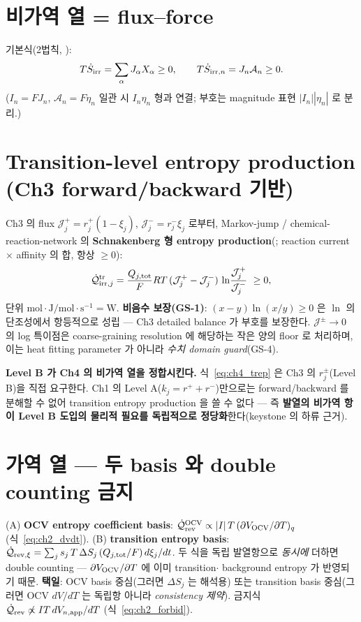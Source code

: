 \section{비가역 열 = flux--force}\label{sec:ch4_irr}
기본식(2법칙, ):
\begin{equation}
T\dot S_{\mathrm{irr}}=\sum_\alpha J_\alpha X_\alpha\ge0,\qquad
T\dot S_{\mathrm{irr},n}=J_n\mathcal A_n\ge0 .
\label{eq:ch4_JA}
\end{equation}
($I_n=FJ_n$, $\mathcal A_n=F\eta_n$ 일관 시 $I_n\eta_n$ 형과 연결; 부호는 magnitude 표현
$|I_n||\eta_n|$ 로 분리.)

\section{Transition-level entropy production (Ch3 forward/backward 기반)}\label{sec:ch4_trep}
Ch3 의 flux $\mathcal J_j^+=r_j^+(1-\xi_j)$, $\mathcal J_j^-=r_j^-\xi_j$ 로부터, Markov-jump / chemical-
reaction-network 의 \textbf{Schnakenberg 형 entropy production}(\cite{schnakenberg1976}; reaction current
$\times$ affinity 의 합, 항상 $\ge0$):
\begin{equation}
\dot{\mathcal Q}_{\mathrm{irr},j}^{\mathrm{tr}}=\frac{Q_{j,\mathrm{tot}}}{F}RT\,(\mathcal J_j^+-\mathcal J_j^-)\,
\ln\!\frac{\mathcal J_j^+}{\mathcal J_j^-}\ \ge 0,
\label{eq:ch4_trep}
\end{equation}
단위 $\mathrm{mol}\cdot\mathrm{J/mol}\cdot\mathrm{s^{-1}}=\mathrm W$. \textbf{비음수 보장(GS-1)}:
$(x-y)\ln(x/y)\ge0$ 은 $\ln$ 의 단조성에서 항등적으로 성립 — Ch3 detailed balance 가 부호를 보장한다.
$\mathcal J^\pm\to0$ 의 log 특이점은 coarse-graining resolution 에 해당하는 작은 양의 floor 로 처리하며,
이는 heat fitting parameter 가 아니라 \emph{수치 domain guard}(GS-4).

\begin{keybox}
\textbf{Level B 가 Ch4 의 비가역 열을 정합시킨다.} 식~\eqref{eq:ch4_trep} 은 Ch3 의 $r_j^\pm$(Level B)을
직접 요구한다. Ch1 의 Level A($k_j=r^++r^-$)만으로는 forward/backward 를 분해할 수 없어 transition
entropy production 을 쓸 수 없다 — 즉 \textbf{발열의 비가역 항이 Level B 도입의 물리적 필요를
독립적으로 정당화}한다(keystone 의 하류 근거).
\end{keybox}

\section{가역 열 — 두 basis 와 double counting 금지}\label{sec:ch4_double}
(A) \textbf{OCV entropy coefficient basis}: $\dot{\mathcal Q}_{\mathrm{rev}}^{\mathrm{OCV}}\propto |I|\,T\,(\partial V_{\mathrm{OCV}}/\partial T)_q$
(식~\eqref{eq:ch2_dvdt}). (B) \textbf{transition entropy basis}:
$\dot{\mathcal Q}_{\mathrm{rev},\xi}=\sum_j s_j\,T\,\Delta S_j\,(Q_{j,\mathrm{tot}}/F)\,d\xi_j/dt$. 두 식을 독립
발열항으로 \emph{동시에} 더하면 double counting — $\partial V_{\mathrm{OCV}}/\partial T$ 에 이미 transition$\cdot$
background entropy 가 반영되기 때문. \textbf{택일}: OCV basis 중심(그러면 $\Delta S_j$ 는 해석용) 또는
transition basis 중심(그러면 OCV $dV/dT$ 는 독립항 아니라 \emph{consistency 제약}). 금지식
$\dot{\mathcal Q}_{\mathrm{rev}}\not\propto IT\,dV_{n,\mathrm{app}}/dT$ (식~\eqref{eq:ch2_forbid}).

